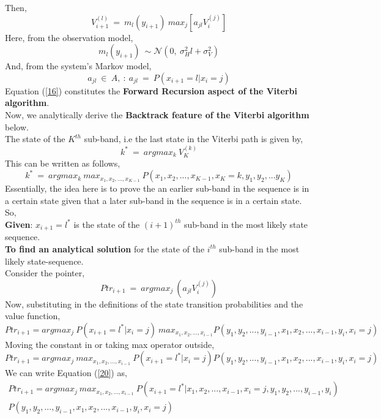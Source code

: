 \documentclass[12pt, draftcls, onecolumn]{IEEEtran}
\begin{document}
Then, 
\begin{equation}\label{16}
    V_{i+1}^{(l)}\ =\ m_l(y_{i+1})\ max_{j}[a_{jl}V_i^{(j)}]
\end{equation}
Here, from the observation model,
\[m_l(y_{i+1})\ \sim \mathcal{N}(0,\ \sigma_H^2l+\sigma_V^2)\]
And, from the system's Markov model,
\[a_{jl}\ \in\ A,\ :\ a_{jl}\ =\ P(x_{i+1}=l|x_i=j)\]
Equation (\ref{16}) constitutes the \textbf{Forward Recursion aspect of the Viterbi algorithm}.
\\Now, we analytically derive the \textbf{Backtrack feature of the Viterbi algorithm} below.
\\The state of the $K^{th}$ sub-band, i.e the last state in the Viterbi path is given by,
\begin{equation}\label{17}
    k^*\ =\ argmax_k\ V_K^{(k)}
\end{equation}
This can be written as follows,
\begin{equation}\label{18}
    k^*\ =\ argmax_k\ max_{x_1,x_2,...,x_{K-1}}\ P(x_1,x_2,...,x_{K-1},x_K=k,y_1,y_2,...y_K)
\end{equation}
Essentially, the idea here is to prove the an earlier sub-band in the sequence is in a certain state given that a later sub-band in the sequence is in a certain state.
\\So,
\\\textbf{Given}: $x_{i+1}=l^*$ is the state of the $(i+1)^{th}$ sub-band in the most likely state sequence.
\\\textbf{To find an analytical solution} for the state of the $i^{th}$ sub-band in the most likely state-sequence.
\\Consider the pointer,
\[Ptr_{i+1}\ =\ argmax_j\ (a_{jl}V_{i}^{(j)})\]
Now, substituting in the definitions of the state transition probabilities and the value function,
\begin{equation}\label{19}
    Ptr_{i+1}=argmax_j\ P(x_{i+1}=l^*|x_{i}=j)\ max_{x_1,x_2,...,x_{i-1}}P(y_1,y_2,...,y_{i-1},x_1,x_2,...,x_{i-1},y_i,x_{i}=j)
\end{equation}
Moving the constant in or taking max operator outside,
\begin{equation}\label{20}
    Ptr_{i+1}=argmax_j\ max_{x_1,x_2,...,x_{i-1}}\ P(x_{i+1}=l^*|x_{i}=j)P(y_1,y_2,...,y_{i-1},x_1,x_2,...,x_{i-1},y_i,x_{i}=j)
\end{equation}
We can write Equation (\ref{20}) as,
\begin{equation}\label{21}
    \begin{aligned}
        Ptr_{i+1}=argmax_j\ max_{x_1,x_2,...,x_{i-1}}\ P(x_{i+1}=l^*|x_1,x_2,...,x_{i-1},x_{i}=j,y_1,y_2,...,y_{i-1},y_{i})\\P(y_1,y_2,...,y_{i-1},x_1,x_2,...,x_{i-1},y_i,x_{i}=j)
    \end{aligned}
\end{equation}
\end{document}
